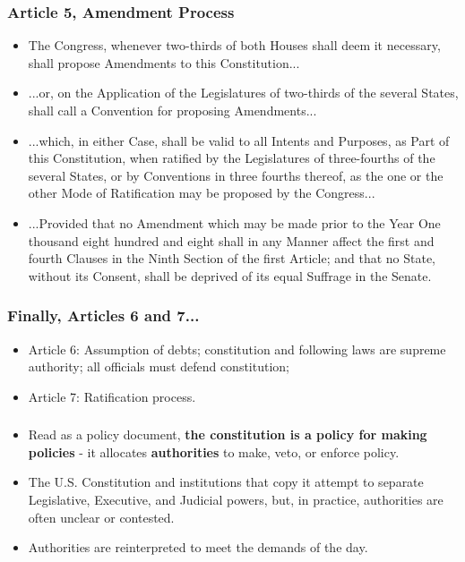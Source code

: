 \documentclass[aspectratio=169]{beamer}
\theoremstyle{principle}
\begin{document}
\begin{frame}
\frametitle{Article 5, Amendment Process}

\begin{itemize} 
\item The Congress, whenever two-thirds of both Houses shall deem it necessary, shall propose Amendments to this Constitution...
\bigskip
\item ...or, on the Application of the Legislatures of two-thirds of the several States, shall call a Convention for proposing Amendments...
\bigskip
\item ...which, in either Case, shall be valid to all Intents and Purposes, as Part of this Constitution, when ratified by the Legislatures of three-fourths of the several States, or by Conventions in three fourths thereof, as the one or the other Mode of Ratification may be proposed by the Congress...
\bigskip
\item ...Provided that no Amendment which may be made prior to the Year One thousand eight hundred and eight shall in any Manner affect the first and fourth Clauses in the Ninth Section of the first Article; and that no State, without its Consent, shall be deprived of its equal Suffrage in the Senate.
\end{itemize}

\end{frame}

\begin{frame}
\frametitle{Finally, Articles 6 and 7...}

\begin{itemize} 
\item Article 6: Assumption of debts; constitution and following laws are supreme authority; all officials must defend constitution;
\bigskip
\bigskip
\item Article 7: Ratification process.
\end{itemize}

\end{frame}

\begin{frame}
\frametitle{}

\begin{itemize} 
\item Read as a policy document, \textbf{the constitution is a policy for making policies} - it allocates \textbf{authorities} to make, veto, or enforce policy. 
\bigskip
\bigskip
\item The U.S. Constitution and institutions that copy it attempt to separate Legislative, Executive, and Judicial powers, but, in practice, authorities are often unclear or contested.
\bigskip
\bigskip
\item Authorities are reinterpreted to meet the demands of the day.
\end{itemize}

\end{frame}
\end{document}
